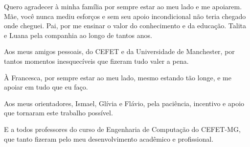 
\begin{agradecimentos}

Quero agradecer à minha família por sempre estar ao meu lado e me apoiarem. Mãe, você
nunca mediu esforços e sem seu apoio incondicional não teria chegado onde cheguei. 
Pai, por me ensinar o valor do conhecimento e da educação. Talita e Luana pela companhia ao 
longo de tantos anos.

Aos meus amigos pessoais, do CEFET e da Universidade de Manchester, por tantos momentos 
inesquecíveis que fizeram tudo valer a pena.

À Francesca, por sempre estar ao meu lado, mesmo estando tão longe, e me apoiar em 
tudo que eu faço.

Aos meus orientadores, Ismael, Glívia e Flávio, pela paciência, incentivo e apoio que tornaram 
este trabalho possível.

E a todos professores do curso de Engenharia de Computação do CEFET-MG, que tanto fizeram
pelo meu desenvolvimento acadêmico e profissional.

\end{agradecimentos}
